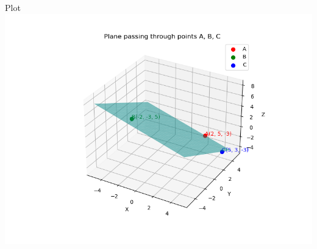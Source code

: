 \documentclass{beamer}
\begin{document}
\begin{frame}{Plot}
    \centering
    \includegraphics[width=\columnwidth, height=0.8\textheight, keepaspectratio]{beamer/figs/fig1.png}     
\end{frame}


	
\end{document}
